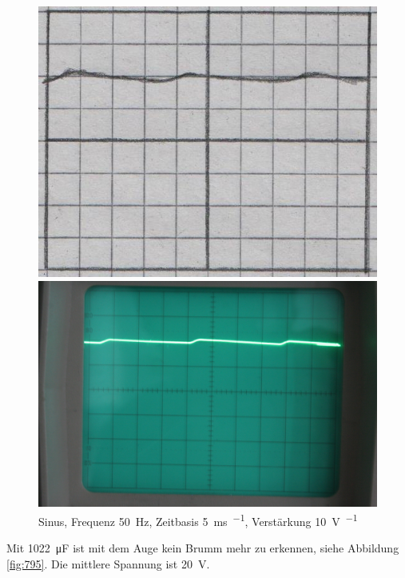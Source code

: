 \begin{figure}[htbp]
	\centering
	\begin{minipage}{.45\linewidth}
	\includegraphics[width=\linewidth]{Oszi_Hand/793.jpg}
	\end{minipage}
	\hfill
	\begin{minipage}{.45\linewidth}
	\includegraphics[width=\linewidth]{Oszi_Foto/793.jpg}
	\end{minipage}
	\caption{%
		Sinus, Frequenz \SI{50}{\hertz},
		Zeitbasis \SI{5}{\milli\second\per\division},
		Verstärkung \SI{10}{\volt\per\division}
	}
	\label{fig:793}
\end{figure}

Mit \SI{1022}{\micro\farad} ist mit dem Auge kein Brumm mehr zu erkennen, siehe
Abbildung \ref{fig:795}. Die mittlere Spannung ist \SI{20}{\volt}.

